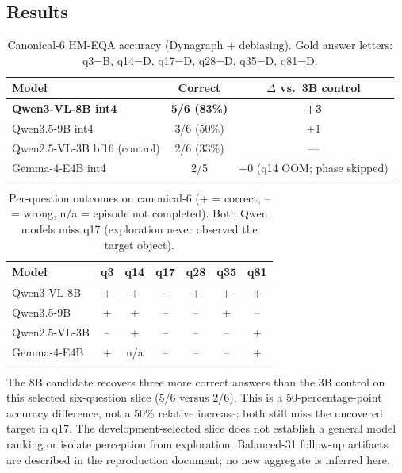 \subsection{Results}

\begin{table}[h]
  \centering
  \caption{Canonical-6 HM-EQA accuracy (Dynagraph + debiasing). Gold answer letters:
  q3=B, q14=D, q17=D, q28=D, q35=D, q81=D.}
  \label{tab:vlm_bakeoff}
  \small
  \begin{tabular}{@{}lcc@{}}
    \toprule
    Model & Correct & $\Delta$ vs.\ 3B control \\
    \midrule
    \textbf{Qwen3-VL-8B int4} & \textbf{5/6 (83\%)} & \textbf{+3} \\
    Qwen3.5-9B int4 & 3/6 (50\%) & +1 \\
    Qwen2.5-VL-3B bf16 (control) & 2/6 (33\%) & --- \\
    Gemma-4-E4B int4 & 2/5 & +0 (q14 OOM; phase skipped) \\
    \bottomrule
  \end{tabular}
\end{table}

\begin{table}[h]
  \centering
  \caption{Per-question outcomes on canonical-6 (+ = correct, -- = wrong, n/a = episode
  not completed). Both Qwen models miss q17 (exploration never observed the target object).}
  \label{tab:vlm_per_question}
  \small
  \begin{tabular}{@{}lcccccc@{}}
    \toprule
    Model & q3 & q14 & q17 & q28 & q35 & q81 \\
    \midrule
    Qwen3-VL-8B & + & + & -- & + & + & + \\
    Qwen3.5-9B & + & + & -- & -- & + & -- \\
    Qwen2.5-VL-3B & -- & + & -- & -- & -- & + \\
    Gemma-4-E4B & + & n/a & -- & -- & -- & + \\
    \bottomrule
  \end{tabular}
\end{table}

The 8B candidate recovers three more correct answers than the 3B control on
this selected six-question slice (5/6 versus 2/6). This is a 50-percentage-point
accuracy difference, not a 50\% relative increase; both still miss the uncovered
target in q17. The development-selected slice does not establish a general model
ranking or isolate perception from exploration. Balanced-31 follow-up artifacts
are described in the reproduction document; no new aggregate is inferred here.

